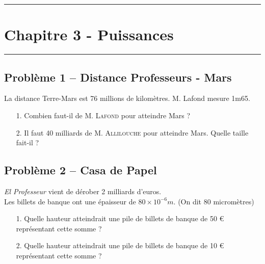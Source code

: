 \documentclass[12pt]{article}
\newcommand{\horrule}[1]{\rule{\linewidth}{#1}} %
\begin{document}

\newtheorem{Definition}{Définition}
\newtheorem{Theorem}{Théorème}
\newtheorem{Proposition}{Propriété}

\renewcommand{\labelitemi}{$\bullet$}
\renewcommand{\labelitemii}{$\circ$}

\setlength{\columnseprule}{1pt}

\horrule{2px}
\section*{Chapitre 3 - Puissances}
\horrule{2px}


\subsection*{Problème 1 – Distance Professeurs - Mars}


La distance Terre-Mars est 76 millions de kilomètres.
M. Lafond mesure 1m65.

\begin{itemize}
\item[1.] Combien faut-il de \textsc{M. Lafond} pour atteindre Mars ?
\item[2.] Il faut 40 milliards de \textsc{M. Allilouche} pour atteindre Mars. Quelle taille fait-il ?
\end{itemize}



\subsection*{Problème 2 – Casa de Papel}


\textit{\og El Professeur \fg{} } vient de dérober 2 milliards d’euros. \\
Les billets de banque ont une épaisseur de $80 \times 10^{-6} m$. (On dit 80 micromètres)

\begin{itemize}
\item[1.] Quelle hauteur atteindrait une pile de billets de banque de 50 \euro{} représentant cette somme ?
\item[2.] Quelle hauteur atteindrait une pile de billets de banque de 10 \euro{} représentant cette somme ?
\end{itemize}
\end{document}

